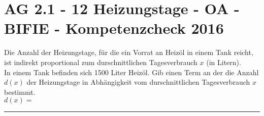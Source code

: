 \section{AG 2.1 - 12 Heizungstage - OA - BIFIE - Kompetenzcheck 2016}

\begin{beispiel}[AG 2.1]{1} %
				Die Anzahl der Heizungstage, für die ein Vorrat an Heizöl in einem Tank reicht, ist indirekt proportional zum durschnittlichen Tagesverbrauch $x$ (in Litern).\\

In einem Tank befinden sich 1500 Liter Heizöl. Gib einen Term an der die Anzahl $d(x)$ der Heizungstage in Abhängigkeit vom durschnittlichen Tagesverbrauch $x$ bestimmt.\\

$d(x)=$\rule{5cm}{0.3pt}\\

\end{beispiel}	